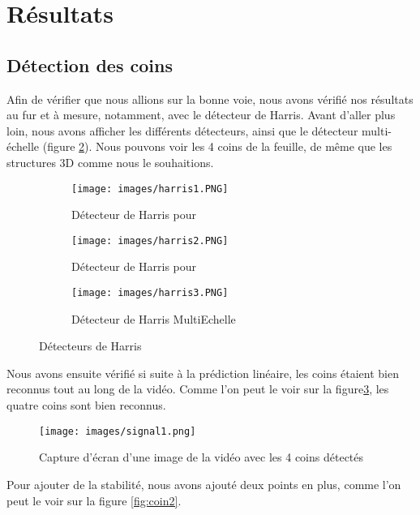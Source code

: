 \documentclass[blue]{ceri/sty/rapport}
\begin{document}
\section{Résultats}
\label{sec:Generalites3}

\subsection{Détection des coins}

Afin de vérifier que nous allions sur la bonne voie, nous avons vérifié nos résultats au fur et à mesure, notamment, avec le détecteur de Harris. Avant d'aller plus loin, nous avons afficher les différents détecteurs, ainsi que le détecteur multi-échelle (figure \ref{fig:subfigures2}). Nous pouvons voir les 4 coins de la feuille, de même que les structures 3D comme nous le souhaitions.

\begin{figure}[H]
\centering
\begin{subfigure}[t]{0.3\textwidth}
\texttt{[image: images/harris1.PNG]}
\caption{Détecteur de Harris pour }
\label{fig:subfig2}
\end{subfigure}
\hfill
\begin{subfigure}[t]{0.3\textwidth}
\texttt{[image: images/harris2.PNG]}
\caption{Détecteur de Harris pour }
\end{subfigure}
\hfill
\begin{subfigure}[t]{0.3\textwidth}
\texttt{[image: images/harris3.PNG]}
\caption{Détecteur de Harris MultiEchelle}
\end{subfigure}
\caption{Détecteurs de Harris}
\label{fig:subfigures2}
\end{figure}



Nous avons ensuite vérifié si suite à la prédiction linéaire, les coins étaient bien reconnus tout au long de la vidéo. Comme l'on peut le voir sur la figure\ref{fig:coin1}, les quatre coins sont bien reconnus. 


\begin{figure}[H]
\centering
\texttt{[image: images/signal1.png]}
\caption[coin1]{Capture d'écran d'une image de la vidéo avec les 4 coins détectés}
\label{fig:coin1}
\end{figure}


Pour ajouter de la stabilité, nous avons ajouté deux points en plus, comme l'on peut le voir sur la figure \ref{fig:coin2}.
\end{document}
